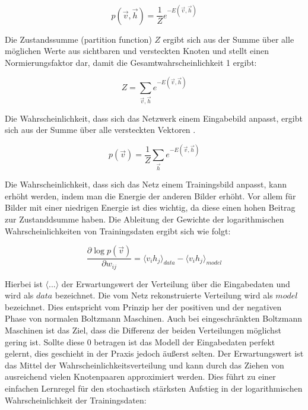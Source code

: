 \documentclass[12pt]{article}
\begin{document}
\begin{equation}
p(\vec{v},\vec{h})= \frac{1}{Z} e^{-E(\vec{v},\vec{h})}
\end{equation}

Die Zustandssumme (partition function) $Z$ ergibt sich aus der Summe über alle möglichen Werte aus sichtbaren und versteckten Knoten und stellt einen Normierungsfaktor dar, damit die Gesamtwahrscheinlichkeit 1 ergibt:

\begin{equation}
Z=\sum_{\vec{v},\vec{h}} e^{-E(\vec{v},\vec{h})}
\end{equation}

Die Wahrscheinlichkeit, dass sich das Netzwerk einem Eingabebild anpasst, ergibt sich aus der Summe über alle versteckten Vektoren \cite{guide}.

\begin{equation}
p(\vec{v})= \frac{1}{Z} \sum_{\vec{h}} e^{-E(\vec{v},\vec{h})}
\end{equation}

Die Wahrscheinlichkeit, dass sich das Netz einem Trainingsbild anpasst, kann erhöht werden, indem man die Energie der anderen Bilder erhöht. Vor allem für Bilder mit einer niedrigen Energie ist dies wichtig, da diese einen hohen Beitrag zur Zustanddsumme haben. Die Ableitung der Gewichte der logarithmischen Wahrscheinlichkeiten von Trainingsdaten ergibt sich wie folgt:

\begin{equation}
\frac{\partial \log p(\vec{v})}{\partial w_{ij}} = \langle v_ih_j \rangle_{data} - \langle v_i h_j \rangle_{model}
\end{equation}

Hierbei ist $\langle...\rangle$ der Erwartungswert der Verteilung über die Eingabedaten und wird als $data$ bezeichnet. Die vom Netz rekonstruierte Verteilung wird als $model$ bezeichnet. Dies entspricht vom Prinzip her der positiven und der negativen Phase von normalen Boltzmann Maschinen. Auch bei eingeschränkten Boltzmann Maschinen ist das Ziel, dass die Differenz der beiden Verteilungen möglichst gering ist. Sollte diese 0 betragen ist das Modell der Eingabedaten perfekt gelernt, dies geschieht in der Praxis jedoch äußerst selten. Der Erwartungswert ist das Mittel der Wahrscheinlichkeitsverteilung und kann durch das Ziehen von ausreichend vielen Knotenpaaren approximiert werden. Dies führt zu einer einfachen Lernregel für den stochastisch stärksten Aufstieg in der logarithmischen Wahrscheinlichkeit der Trainingsdaten:
\end{document}
